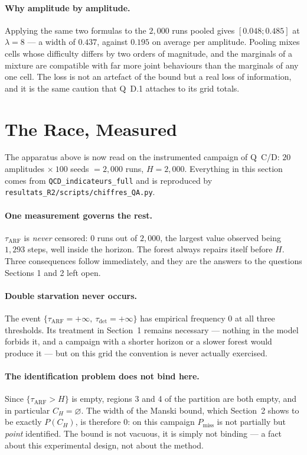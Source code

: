 \documentclass[11pt,a4paper]{article}
\begin{document}
\paragraph{Why amplitude by amplitude.} Applying the same two formulas to the $2{,}000$
runs pooled gives $[0.048;0.485]$ at $\lambda = 8$ --- a width of $0.437$, against
$0.195$ on average per amplitude. Pooling mixes cells whose difficulty differs by two
orders of magnitude, and the marginals of a mixture are compatible with far more joint
behaviours than the marginals of any one cell. The loss is not an artefact of the bound
but a real loss of information, and it is the same caution that Q~D.1 attaches to its
grid totals.

\section{The Race, Measured}
\label{sec:measured}

The apparatus above is now read on the instrumented campaign of Q~C/D: $20$ amplitudes
$\times\ 100$ seeds $=2{,}000$ runs, $H=2{,}000$. Everything in this section comes from
\texttt{QCD\_indicateurs\_full} and is reproduced by
\texttt{resultats\_R2/scripts/chiffres\_QA.py}.

\paragraph{One measurement governs the rest.} $\tau_{\mathrm{ARF}}$ is \emph{never}
censored: $0$ runs out of $2{,}000$, the largest value observed being $1{,}293$ steps,
well inside the horizon. The forest always repairs itself before $H$. Three consequences
follow immediately, and they are the answers to the questions Sections 1 and 2 left open.

\paragraph{Double starvation never occurs.} The event
$\{\tau_{\mathrm{ARF}}=+\infty,\ \tau_{\mathrm{det}}=+\infty\}$ has empirical frequency
$0$ at all three thresholds. Its treatment in Section~1 remains necessary --- nothing
in the model forbids it, and a campaign with a shorter horizon or a slower forest would
produce it --- but on this grid the convention is never actually exercised.

\paragraph{The identification problem does not bind here.} Since
$\{\tau_{\mathrm{ARF}}>H\}$ is empty, regions 3 and 4 of the partition are both empty,
and in particular $C_H=\varnothing$. The width of the Manski bound, which Section~2
shows to be exactly $P(C_H)$, is therefore $0$: on this campaign $P_{\mathrm{miss}}$ is
not partially but \emph{point} identified. The bound is not vacuous, it is simply not
binding --- a fact about this experimental design, not about the method.
\end{document}
